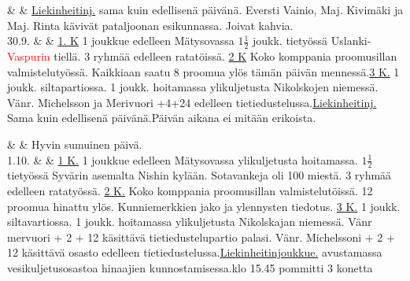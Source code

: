 \documentclass[11pt,a5paper,oneside]{book}
\begin{document}
\newpage

& & \underline{Liekinheitinj.} sama kuin edellisenä päivänä. \newline Eversti Vainio, Maj. Kivimäki ja Maj. Rinta kävivät pataljoonan esikunnassa. Joivat kahvia. \newline\newline\newline \\

30.9. & & \underline{1. K} 1 joukkue edelleen Mätysovassa $1\frac{1}{2}$ joukk. tietyössä Uslanki-\textcolor{red}{Vaspurin} tiellä. 3 ryhmää edelleen ratatöissä. \newline\newline \underline{2 K} Koko komppania proomusillan valmistelutyössä. Kaikkiaan saatu 8 proomua ylös tämän päivän mennessä.\newline\newline \underline{3 K.} 1 joukk. siltapartiossa. 1 joukk. hoitamassa ylikuljetusta Nikolskojen niemessä. Vänr. Michelsson ja Merivuori +4+24 edelleen tietiedustelussa.\newline\newline \underline{Liekinheitinj.} Sama kuin edellisenä päivänä.\newline Päivän aikana ei mitään erikoista. \\

\taulustop


& & Hyvin sumuinen päivä. \newline\newline \\

1.10. & & \underline{1 K.} 1 joukkue edelleen Mätysovassa ylikuljetusta hoitamassa. $1\frac{1}{2}$ tietyössä Syvärin asemalta Nishin kylään. Sotavankeja oli 100 miestä. 3 ryhmää edelleen ratatyössä. \newline\newline \underline{2 K.} Koko komppania proomusillan valmistelutöissä. 12 proomua hinattu ylös. Kunniemerkkien jako ja ylennysten tiedotus. \newline \underline{3 K.} 1 joukk. siltavartiossa. 1 joukk. hoitamassa ylikuljetusta Nikolskajan niemessä. Vänr mervuori + 2 + 12 käsittävä tietiedustelupartio palasi. Vänr. Michelssoni + 2 + 12 käsittävä osasto edelleen tietiedustelussa.\newline\newline \underline{Liekinheitinjoukkue.} avustamassa vesikuljetusosastoa hinaajien kunnostamisessa.\newline klo 15.45 pommitti 3 konetta \\
\end{document}
